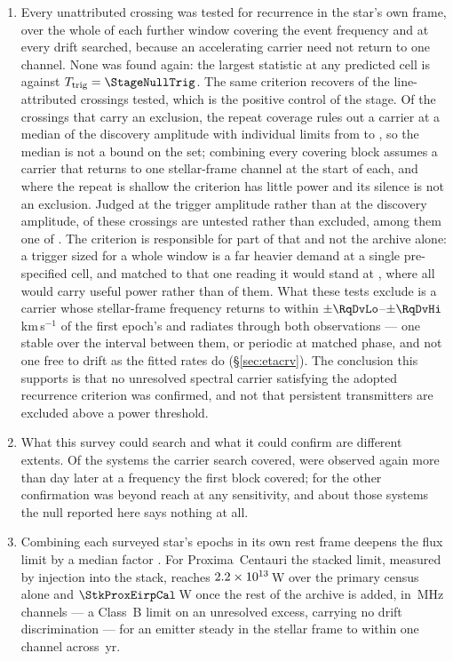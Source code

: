 \begin{enumerate}[leftmargin=1.6em,itemsep=4pt,topsep=4pt,parsep=0pt]
\item Every unattributed crossing was tested for recurrence in the star's
own frame, over the whole of each further window covering the event frequency
and at every drift searched, because an accelerating carrier need not return
to one channel. None was found again: the largest statistic at any predicted
cell is \RcTMax{} against $T_{\rm trig}=\StageNullTrig$. The same criterion
recovers \MkAttrRecur{} of the \MkAttrTested{} line-attributed crossings
tested, which is the positive control of the stage.
Of the \RcNExcl{} crossings
that carry an exclusion, the repeat coverage rules out a carrier at a median
\RcFracMed{} of the discovery amplitude with individual limits from
\RcFracMin{} to \RcFracMax, so the median is not a bound on the set;
combining every covering block assumes a carrier that returns to one
stellar-frame channel at the start of each, and where the repeat is shallow
the criterion has little power and its silence is not an exclusion. Judged at
the trigger amplitude rather than at the discovery amplitude,
\RcNPowerLoTrig{} of these crossings are untested rather than excluded, among
them one of \PrRankClause. The criterion is responsible for part of that and
not the archive alone: a trigger sized for a whole window is a far heavier
demand at a single pre-specified cell, and matched to that one reading it
would stand at \ZtTrialThr, where all \RcNExcl{} would carry useful power
rather than \RqNPowerHi{} of them. What
these tests exclude is a carrier whose stellar-frame frequency returns to
within $\pm\RqDvLo$--$\pm\RqDvHi$\,km\,s$^{-1}$ of the first epoch's and
radiates through both observations --- one stable over the interval between
them, or periodic at matched phase, and not one free to drift as the fitted
rates do (\S\ref{sec:etacrv}). The conclusion
this supports is that no unresolved spectral carrier satisfying the adopted
recurrence criterion was confirmed, and not that persistent transmitters are
excluded above a power threshold.

\item What this survey could search and what it could confirm are different
extents. Of the \NSysClassA{} systems the carrier search covered,
\RcConfSysDay{} were observed again more than \EpSep{} day later at a
frequency the first block covered; for the other \RcNoRepSys{} confirmation
was beyond reach at any sensitivity, and about those systems the null
reported here says nothing at all.

\item Combining each surveyed star's epochs in its own rest frame deepens
the flux limit by a median factor \SyStkGainMed. For Proxima~Centauri the
stacked limit, measured by injection into the stack, reaches
$2.2\times10^{13}$\,W over the primary census alone and
$\StkProxEirpCal$\,W once the rest of the archive is added, in
\ChanBModeMHz\,MHz channels --- a Class~B limit on an unresolved excess,
carrying no drift discrimination --- for an emitter steady in the stellar
frame to within one channel across \StkProxSpanYr\,yr.


\end{enumerate}
